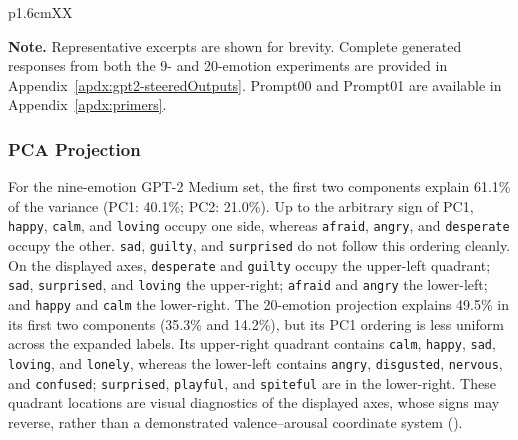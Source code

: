 \begin{table}[!htbp]
\begin{tabularx}{\linewidth}{p{1.6cm}XX}
    \bottomrule
    \end{tabularx}

    \vspace{0.3em}
    \begin{minipage}{\linewidth}
        \footnotesize
        \textbf{Note.} Representative excerpts are shown for brevity. Complete generated responses from both the 
        9- and 20-emotion experiments are provided in Appendix~\ref{apdx:gpt2-steeredOutputs}. Prompt00 and Prompt01 are available in 
        Appendix~\ref{apdx:primers}.
    \end{minipage}
\end{table}

\subsubsection{PCA Projection}

For the nine-emotion GPT-2 Medium set, the first two components explain 61.1\% of the variance (PC1: 40.1\%; PC2: 21.0\%). Up to the 
arbitrary sign of PC1, \texttt{happy}, \texttt{calm}, and \texttt{loving} occupy one side, whereas \texttt{afraid}, \texttt{angry}, 
and \texttt{desperate} occupy the other. \texttt{sad}, \texttt{guilty}, and \texttt{surprised} do not follow this ordering cleanly. 
On the displayed axes, \texttt{desperate} and \texttt{guilty} occupy the upper-left quadrant; \texttt{sad}, \texttt{surprised}, and 
\texttt{loving} the upper-right; \texttt{afraid} and \texttt{angry} the lower-left; and \texttt{happy} and \texttt{calm} the lower-right. 
The 20-emotion projection explains 49.5\% in its first two components (35.3\% and 14.2\%), but its PC1 ordering is less uniform across 
the expanded labels. Its upper-right quadrant contains \texttt{calm}, \texttt{happy}, \texttt{sad}, \texttt{loving}, and \texttt{lonely}, 
whereas the lower-left contains \texttt{angry}, \texttt{disgusted}, \texttt{nervous}, and \texttt{confused}; \texttt{surprised}, 
\texttt{playful}, and \texttt{spiteful} are in the lower-right. These quadrant locations are visual diagnostics of the displayed axes, 
whose signs may reverse, rather than a demonstrated valence--arousal coordinate system ().

